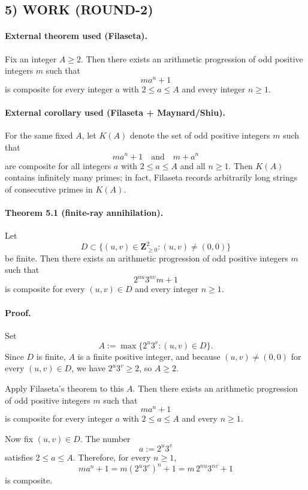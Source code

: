 \subsection*{5) WORK (ROUND-2)}

\paragraph{External theorem used (Filaseta).}
Fix an integer $A\ge 2$. Then there exists an arithmetic progression of odd positive integers $m$ such that
\[
m a^n+1
\]
is composite for every integer $a$ with $2\le a\le A$ and every integer $n\ge 1$.

\paragraph{External corollary used (Filaseta + Maynard/Shiu).}
For the same fixed $A$, let $K(A)$ denote the set of odd positive integers $m$ such that
\[
m a^n+1 \quad \text{and} \quad m+a^n
\]
are composite for all integers $a$ with $2\le a\le A$ and all $n\ge 1$. Then $K(A)$ contains infinitely many primes; in fact, Filaseta records arbitrarily long strings of consecutive primes in $K(A)$.

\paragraph{Theorem 5.1 (finite-ray annihilation).}
Let
\[
D\subset \{(u,v)\in \mathbf{Z}_{\ge 0}^2:(u,v)\neq (0,0)\}
\]
be finite. Then there exists an arithmetic progression of odd positive integers $m$ such that
\[
2^{nu}3^{nv}m+1
\]
is composite for every $(u,v)\in D$ and every integer $n\ge 1$.

\paragraph{Proof.}
Set
\[
A:=\max\{2^u3^v:(u,v)\in D\}.
\]
Since $D$ is finite, $A$ is a finite positive integer, and because $(u,v)\neq (0,0)$ for every $(u,v)\in D$, we have $2^u3^v\ge 2$, so $A\ge 2$.

Apply Filaseta's theorem to this $A$. Then there exists an arithmetic progression of odd positive integers $m$ such that
\[
m a^n+1
\]
is composite for every integer $a$ with $2\le a\le A$ and every $n\ge 1$.

Now fix $(u,v)\in D$. The number
\[
a:=2^u3^v
\]
satisfies $2\le a\le A$. Therefore, for every $n\ge 1$,
\[
m a^n+1 = m(2^u3^v)^n+1 = m\,2^{nu}3^{nv}+1
\]
is composite.

